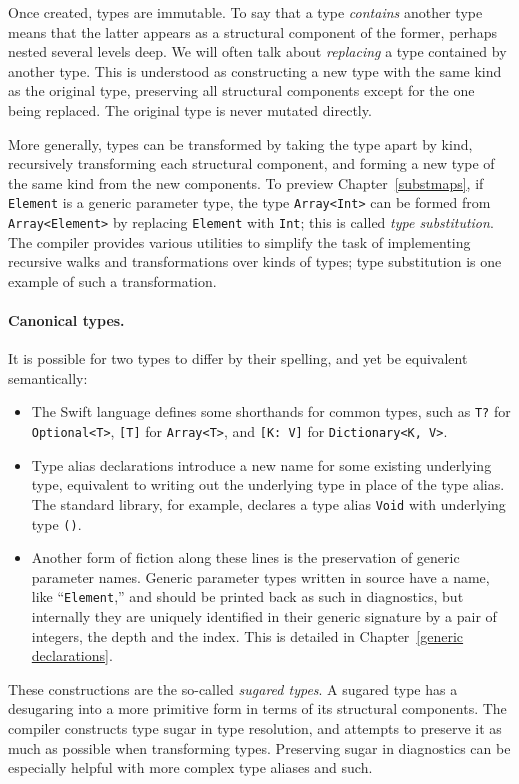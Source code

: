 \documentclass[../generics]{subfiles}
\begin{document}
Once created, types are immutable. To say that a type \emph{contains} another type means that the latter appears as a structural component of the former, perhaps nested several levels deep.  We will often talk about \emph{replacing} a type contained by another type. This is understood as constructing a new type with the same kind as the original type, preserving all structural components except for the one being replaced. The original type is never mutated directly.

More generally, types can be transformed by taking the type apart by kind, recursively transforming each structural component, and forming a new type of the same kind from the new components. To preview Chapter~\ref{substmaps}, if \texttt{Element} is a generic parameter type, the type \texttt{Array<Int>} can be formed from \texttt{Array<Element>} by replacing \texttt{Element} with \texttt{Int}; this is called \emph{type substitution}. The compiler provides various utilities to simplify the task of implementing recursive walks and transformations over kinds of types; type substitution is one example of such a transformation.

\paragraph{Canonical types.} It is possible for two types to differ by their spelling, and yet be equivalent semantically:
\begin{itemize}
\item The Swift language defines some shorthands for common types, such as \texttt{T?} for \texttt{Optional<T>}, \texttt{[T]} for \texttt{Array<T>}, and \texttt{[K:\ V]} for \texttt{Dictionary<K, V>}.
\item {}Type alias declarations introduce a new name for some existing underlying type, equivalent to writing out the underlying type in place of the type alias. The standard library, for example, declares a type alias \texttt{Void} with underlying type \texttt{()}.
\item Another form of fiction along these lines is the preservation of generic parameter names. Generic parameter types written in source have a name, like ``\texttt{Element},'' and should be printed back as such in diagnostics, but internally they are uniquely identified in their generic signature by a pair of integers, the depth and the index. This is detailed in Chapter~\ref{generic declarations}.
\end{itemize}
These constructions are the so-called \emph{sugared types}. A sugared type has a desugaring into a more primitive form in terms of its structural components. The compiler constructs type sugar in type resolution, and attempts to preserve it as much as possible when transforming types. Preserving sugar in diagnostics can be especially helpful with more complex type aliases and such.
\end{document}
